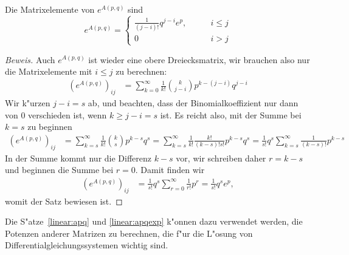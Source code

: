 \begin{satz}
\label{linear:apqexp}
Die Matrixelemente von $e^{A(p,q)}$ sind 
\[
e^{A(p,q)}
=
\begin{cases}
\frac1{(j-i)!}q^{j-i}e^p,
 &\qquad i\le j\\
0&\qquad i>j
\end{cases}
\]
\end{satz}

\begin{proof}[Beweis]
Auch $e^{A(p,q)}$ ist wieder eine obere Dreiecksmatrix, wir brauchen also
nur die Matrixelemente mit $i\le j$ zu berechnen:
\begin{align*}
(e^{A(p,q)})_{ij}
&=
\sum_{k=0}^\infty \frac1{k!}\binom{k}{j-i}p^{k-(j-i)}q^{j-i}
\end{align*}
Wir k"urzen $j-i=s$ ab, und beachten, dass der Binomialkoeffizient nur
dann von $0$ verschieden ist, wenn $k\ge j-i=s$ ist.
Es reicht also, mit der Summe bei $k=s$ zu beginnen
\begin{align*}
(e^{A(p,q)})_{ij}
&=
\sum_{k=s}^\infty \frac1{k!}\binom{k}{s}p^{k-s}q^s
=
\sum_{k=s}^\infty \frac1{k!}\frac{k!}{(k-s)!s!}p^{k-s}q^s
=
\frac1{s!}q^s \sum_{k=s}^\infty \frac{1}{(k-s)!}p^{k-s}
\end{align*}
In der Summe kommt nur die Differenz $k-s$ vor, wir schreiben
daher $r=k-s$ und beginnen die Summe bei $r=0$.
Damit finden wir
\begin{align*}
(e^{A(p,q)})_{ij}
&=
\frac1{s!}q^s \sum_{r=0}^\infty \frac{1}{r!}p^r
=
\frac1{s!}q^se^p,
\end{align*}
womit der Satz bewiesen ist.
\end{proof}

Die S"atze~\ref{linear:apq} und \ref{linear:apqexp} k"onnen dazu verwendet
werden, die Potenzen anderer Matrizen zu berechnen, die f"ur die L"osung von
Differentialgleichungssystemen wichtig sind.


